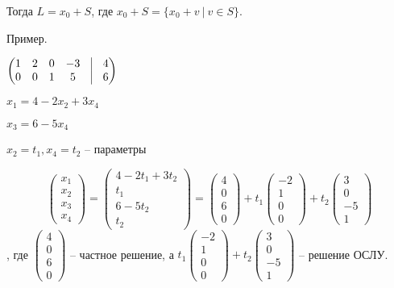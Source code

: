 Тогда $L = x_0 + S$, где $x_0 + S = \{ x_0 + v \ | \ v \in S \}$.

\vspace{\baselineskip}
Пример.

\vspace{\baselineskip}
$\begin{pmatrix} 1 & 2 & 0 & -3 & \vline & 4 \\ 0 & 0 & 1 & 5 & \vline & 6 \end{pmatrix}$

\vspace{\baselineskip}
$x_1 = 4 - 2x_2 + 3x_4$

$x_3 = 6 - 5x_4$

$x_2 = t_1, x_4 = t_2$ -- параметры

\[ \begin{pmatrix} x_1 \\ x_2 \\ x_3 \\ x_4 \end{pmatrix} = \begin{pmatrix} 4 - 2t_1 + 3t_2 \\ t_1 \\ 6 - 5t_2 \\ t_2 \end{pmatrix} = \begin{pmatrix} 4 \\ 0 \\ 6 \\ 0 \end{pmatrix} + t_1 \begin{pmatrix} -2 \\ 1 \\ 0 \\ 0 \end{pmatrix} + t_2 \begin{pmatrix} 3 \\ 0 \\ -5 \\ 1 \end{pmatrix} \], где $\begin{pmatrix} 4 \\ 0 \\ 6 \\ 0 \end{pmatrix}$ -- частное решение, а $ t_1 \begin{pmatrix} -2 \\ 1 \\ 0 \\ 0 \end{pmatrix} + t_2 \begin{pmatrix} 3 \\ 0 \\ -5 \\ 1 \end{pmatrix} $ -- решение ОСЛУ.

